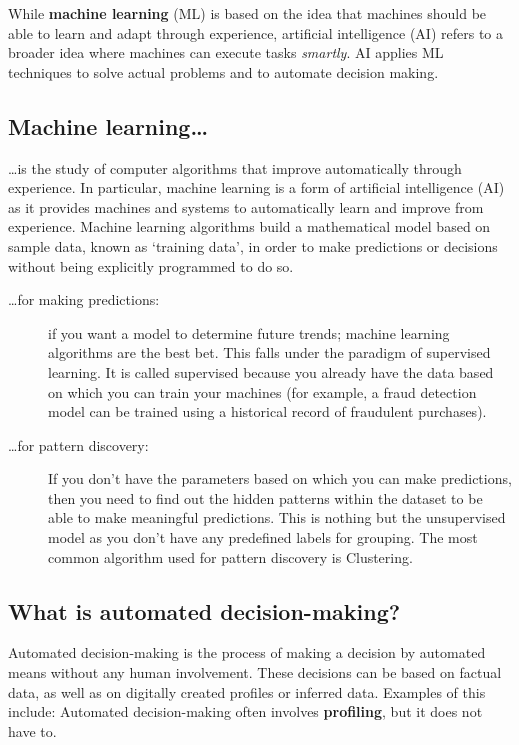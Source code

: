 While \textbf{machine learning} (ML) is based on the idea that machines should be able to learn and adapt through experience, artificial intelligence (AI) refers to a broader idea where machines can execute tasks \textit{smartly}. AI applies ML techniques to solve actual problems and to automate decision making.


\subsection{Machine learning\dots}
\dots  is the study of computer algorithms that improve automatically through experience. In particular,  machine learning is a form of artificial intelligence (AI) as it provides machines and systems to automatically learn and improve from experience. Machine learning algorithms build a mathematical model based on sample data, known as `training data', in order to make predictions or decisions without being explicitly programmed to do so.
\begin{description}
	\item[\dots  for making predictions:] if you want a model to determine future
	trends; machine learning algorithms are the best bet. This falls under the paradigm of
	supervised learning. It is called supervised because you already have the data based on
	which you can train your machines (for example, a fraud detection model can be
	trained using a historical record of fraudulent purchases).\\
	
	\item[\dots for pattern discovery:] If you don’t have the parameters based on which you can make
	predictions, then you need to find out the hidden patterns within the dataset to be
	able to make meaningful predictions. This is nothing but the unsupervised model as
	you don’t have any predefined labels for grouping. The most common algorithm used
	for pattern discovery is Clustering.
\end{description}



\subsection{What is automated decision-making?}
Automated decision-making is the process of making a decision by automated means without any human involvement. These decisions can be based on factual data, as well as on digitally created profiles or inferred data. Examples of this include:	
Automated decision-making often involves \textbf{profiling}, but it does not have to.


